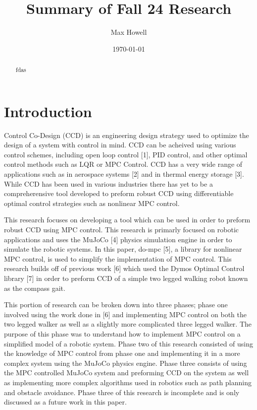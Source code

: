 \documentclass{./springer/svjour3}
\title{Summary of Fall 24 Research}
\author{Max Howell}
\institute{University Of Tennessee Knoxville$^*$ ($^*$corresponding author),
          \email{mhowel30@vols.utk.edu} \\
        \\
          \at MABE, University of Tennessee, Knoxville,
          \at Nathan W. Dougherty Engineering Building, 1512 Middle Dr, Knoxville, TN 37916\\
}
\date{\today}
\begin{document}
\maketitle{}

\begin{abstract}

fdas

\end{abstract}

\section{Introduction}

Control Co-Design (CCD) is an engineering design strategy used to optimize the design of a system with control in mind. CCD can be acheived using various control schemes, 
including open loop control [1], PID control, and other optimal control methods such as LQR or MPC Control. CCD has a very wide range of applications such as in 
aerospace systems [2] and in thermal energy storage [3]. While CCD has been used in various industries there has yet to be a compreherensive tool developed
to preform robust CCD using differentiable optimal control strategies such as nonlinear MPC control.

This research focuses on developing a tool which can be used in order to preform robust CCD using MPC control. This research is primarly focused on robotic applications and uses 
the MuJoCo [4] physics simulation engine in order to simulate the robotic systems. In this paper, do-mpc [5], a library for nonlinear MPC control, is used to simplify the 
implementation of MPC control. This research builds off of previous work [6] which used the Dymos Optimal Control library [7] in order to preform CCD of a simple 
two legged walking robot known as the compass gait. 

This portion of research can be broken down into three phases; phase one involved using the work done in [6] and implementing MPC control on both the two legged walker 
as well as a slightly more complicated three legged walker. The purpose of this phase was to understand how to implement MPC control on a simplified model of a robotic system.
Phase two of this research consisted of using the knowledge of MPC control from phase one and implementing it in a more complex system using the MuJoCo physics engine.
Phase three consists of using the MPC controlled MuJoCo system and preforming CCD on the system as well as implementing more complex algorithms used in robotics such as 
path planning and obstacle avoidance. Phase three of this research is incomplete and is only discussed as a future work in this paper.
\end{document}
